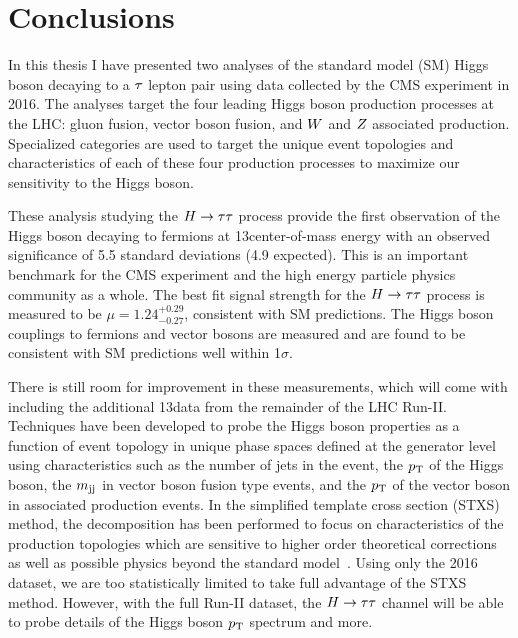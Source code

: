 \chapter{Conclusions}
\label{sec:conclusion}

In this thesis I have presented two analyses of the standard model (SM) Higgs boson decaying 
to a $\tau$ lepton pair using data collected by the CMS experiment in 2016.
The analyses target the four leading Higgs boson production processes at the LHC:
gluon fusion, vector boson fusion, and $W$ and $Z$ associated production.
Specialized categories are used to target the unique event topologies and 
characteristics of each of these four production processes to maximize our
sensitivity to the Higgs boson. 

These analysis studying the $H\to\tau\tau$ process provide the first 
observation of the Higgs boson decaying to fermions at 13\TeV center-of-mass energy
with an observed significance of 5.5 standard deviations (4.9 expected). 
This is an important benchmark for the CMS experiment and the high energy
particle physics community as a whole.
The best fit signal strength for the $H\to\tau\tau$ process is measured to be 
$\mu = 1.24 ^{+0.29} _{-0.27}$, consistent with SM predictions.
The Higgs boson couplings to fermions and vector bosons are measured and are found to be
consistent with SM predictions well within 1$\sigma$.

There is still room for improvement in these measurements, which will come with
including the additional 13\TeV data from the remainder of the LHC Run-II. 
Techniques have been developed to probe the Higgs boson properties as a function
of event topology in unique phase spaces defined at the generator 
level using characteristics such as the number of jets
in the event, the $p_\mathrm{T}$ of the Higgs boson, the $m_\mathrm{jj}$ in vector boson
fusion type events, and the $p_\mathrm{T}$ of the
vector boson in associated production events. In the simplified template
cross section (STXS) method, the decomposition has been performed to focus on 
characteristics of the production topologies which are sensitive to higher
order theoretical corrections as well as possible physics beyond the standard
model~\cite{Tackmann:2138079}. Using only the 2016 dataset, we are too
statistically limited to take full advantage of the STXS method. However, with the
full Run-II dataset, the $H\to\tau\tau$ channel will be able to probe details of the
Higgs boson $p_\mathrm{T}$ spectrum and more.

